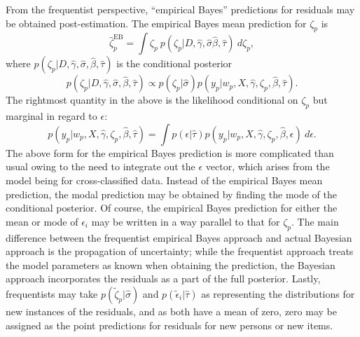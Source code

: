 \documentclass[12pt, letterpaper]{article}
\begin{document}
From the frequentist perspective, ``empirical Bayes'' predictions for residuals may be obtained post-estimation. The empirical Bayes mean prediction for $\zeta_p$ is
\begin{equation}
	\hat \zeta_p^\mathrm{EB} =
	\int 
		\zeta_p ~p(\zeta_p |D, \hat \gamma, \hat \sigma 
		                    \hat \beta, \hat \tau) 
	~d\zeta_p
,\end{equation}
where $p(\zeta_p |D, \hat \gamma, \hat \sigma, \hat \beta, \hat \tau)$ is the conditional posterior
\begin{equation}
	p(\zeta_p |D, \hat \gamma, \hat \sigma,  \hat \beta, \hat \tau)  \propto
	p(\zeta_p| \hat \sigma)
	p(y_p | w_p, X, \hat \gamma, \zeta_p, \hat \beta, \hat \tau)
.\end{equation}
The rightmost quantity in the above is the likelihood conditional on $\zeta_p$ but marginal in regard to $\epsilon$:
\begin{equation}
	p(y_p | w_p, X, \hat \gamma, \zeta_p, \hat \beta, \hat \tau) =
	\int
		p(\epsilon | \hat \tau)
		p(y_p | w_p, X, \hat \gamma, \zeta_p, \hat \beta, \epsilon)
	~d \epsilon
.\end{equation}
The above form for the empirical Bayes prediction is more complicated than usual owing to the need to integrate out the $\epsilon$ vector, which arises from the model being for cross-classified data. Instead of the empirical Bayes mean prediction, the modal prediction may be obtained by finding the mode of the conditional posterior. Of course, the empirical Bayes prediction for either the mean or mode of $\epsilon_i$ may be written in a way parallel to that for $\zeta_p$. The main difference between the frequentist empirical Bayes approach and actual Bayesian approach is the propagation of uncertainty; while the frequentist approach treats the model parameters as known when obtaining the prediction, the Bayesian approach incorporates the residuals as a part of the full posterior. Lastly, frequentists may take $p(\tilde \zeta_p | \hat \sigma)$ and $p(\tilde \epsilon_i | \hat \tau)$ as representing the distributions for new instances of the residuals, and as both have a mean of zero, zero may be assigned as the point predictions for residuals for new persons or new items.
\end{document}
